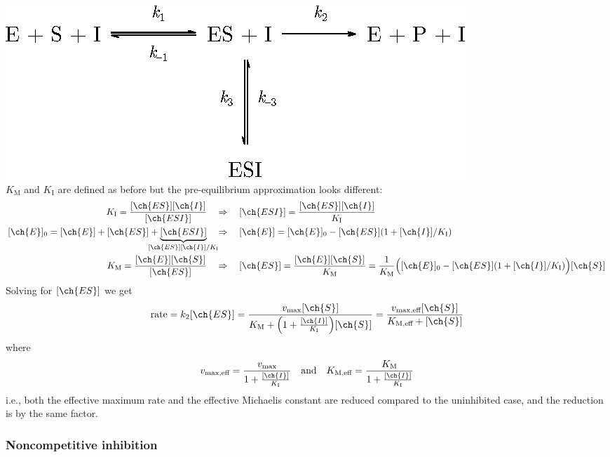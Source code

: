 \documentclass[11pt,a4paper,twoside]{article}
\numberwithin{equation}{section}
\begin{document}
\hspace*{2em}\includegraphics{uncompetitive_inhibition.eps}\\

$K_{\text{M}}$ and $K_{\text{I}} $ are defined as before but the pre-equilibrium approximation looks different:
\begin{align}
    K_{\text{I}} = \frac{[\ch{ES}][\ch{I}]}{[\ch{ESI}]} \quad & \Rightarrow \quad
    [\ch{ESI}] = \frac{[\ch{ES}][\ch{I}]}{K_{\text{I}}} \\
    [\ch{E}]_0 =  [\ch{E}] + [\ch{ES}] + \underbrace{[\ch{ESI}]}_{\mathclap{[\ch{ES}][\ch{I}] / K_{\text{I}}}} \quad & \Rightarrow \quad [\ch{E}] = [\ch{E}]_0 - [\ch{ES}]\qty(1 + [\ch{I}] / K_{\text{I}}) \\ 
    K_{\text{M}} = \frac{[\ch{E}][\ch{S}]}{[\ch{ES}]} \quad & \Rightarrow \quad
    [\ch{ES}] = \frac{[\ch{E}][\ch{S}]}{K_{\text{M}}} = \frac{1}{K_{\text{M}}} 
    \qty\Big( [\ch{E}]_0 - [\ch{ES}]\qty(1 + [\ch{I}] / K_{\text{I}})  ) [\ch{S}]
\end{align}
Solving for $[\ch{ES}]$ we get
\begin{equation}
    \text{rate} = k_2 [\ch{ES}] = \frac{v_{\text{max}} [\ch{S}]}{K_{\text{M}} + \qty(1 + \frac{[\ch{I}]}{K_{\text{I}}})[\ch{S}]} = 
    \frac{v_{\text{max,eff}} [\ch{S}]}{K_{\text{M,eff}} + [\ch{S}]}
\end{equation}
where
\begin{equation}
    v_{\text{max,eff}} = \frac{
        v_{\text{max}}
    }{
        1 + \frac{[\ch{I}]}{K_{\text{I}}}
    } \qqtext{and} 
    K_{\text{M,eff}} = \frac{
        K_{\text{M}}
    }{
        1 + \frac{[\ch{I}]}{K_{\text{I}}}
    }
\end{equation}
i.e., both the effective maximum rate and the effective Michaelis constant are reduced compared to the uninhibited case, and the reduction is by the same factor.


\subsubsection{Noncompetitive inhibition}
\end{document}
